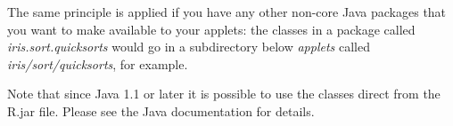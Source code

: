 The same principle is applied if you have any other non-core Java
packages that you want to make available to your applets: the classes in
a package called \emph{iris.sort.quicksorts} would go in a subdirectory
below \emph{applets} called \emph{iris/sort/quicksorts}, for example.

Note that since Java 1.1 or later it is possible to use the
classes direct from the \nr{}R.jar file. Please see the Java documentation for details.

